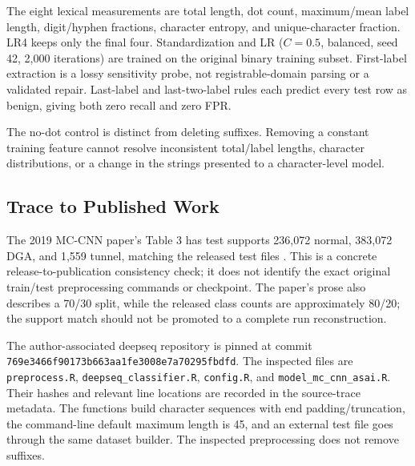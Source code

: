 \documentclass[conference]{IEEEtran}
\newcommand{\code}[1]{\texttt{#1}}
\begin{document}
\begin{table}[!htbp]
\caption{Original CTU lexical controls. Training is unchanged; only test representation differs. LENGTH uses a threshold selected from seven candidates by training F1, selecting 30.}

\end{table}
The eight lexical measurements are total length, dot count, maximum/mean label length, digit/hyphen fractions, character entropy, and unique-character fraction. LR4 keeps only the final four. Standardization and LR ($C=0.5$, balanced, seed 42, 2,000 iterations) are trained on the original binary training subset. First-label extraction is a lossy sensitivity probe, not registrable-domain parsing or a validated repair. Last-label and last-two-label rules each predict every test row as benign, giving both zero recall and zero FPR.

\begin{table}[!htbp]
\caption{Additional constant-dot negative control. LR7 omits only dot count. In each representation its entire predicted-label array equals LR8's array; the fitted LR8 dot-count coefficient is zero.}

\end{table}
The no-dot control is distinct from deleting suffixes. Removing a constant training feature cannot resolve inconsistent total/label lengths, character distributions, or a change in the strings presented to a character-level model.

\subsection{Trace to Published Work}
The 2019 MC-CNN paper's Table 3 has test supports 236,072 normal, 383,072 DGA, and 1,559 tunnel, matching the released test files \cite{ctupaper}. This is a concrete release-to-publication consistency check; it does not identify the exact original train/test preprocessing commands or checkpoint. The paper's prose also describes a 70/30 split, while the released class counts are approximately 80/20; the support match should not be promoted to a complete run reconstruction.

The author-associated deepseq repository is pinned at commit \code{769e3466f90173b663aa1fe3008e7a70295fbdfd}. The inspected files are \code{preprocess.R}, \code{deepseq\_classifier.R}, \code{config.R}, and \code{model\_mc\_cnn\_asai.R}. Their hashes and relevant line locations are recorded in the source-trace metadata. The functions build character sequences with end padding/truncation, the command-line default maximum length is 45, and an external test file goes through the same dataset builder. The inspected preprocessing does not remove suffixes.
\end{document}
